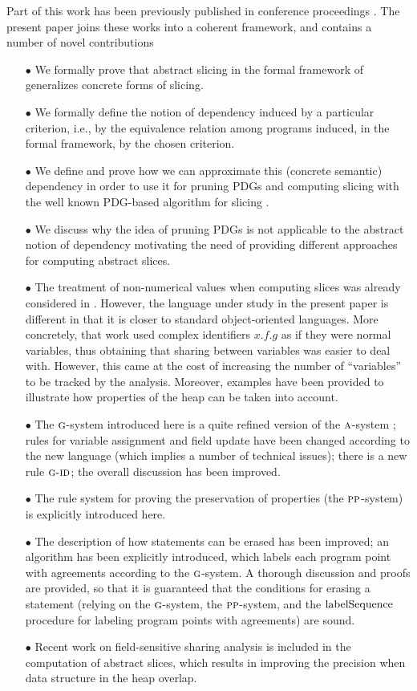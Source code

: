 \documentclass[prodmode,acmtocl]{acmsmall}
\newcommand{\0}{\mbox{\bf 0}}
\newcommand{\CODE}[1]{\ensuremath{\mbox{\lstinline!#1!}\xspace}\xspace}
\newcommand{\RULENAME}[1]{\textsc{#1}}
\newcommand{\GRULENAME}[1]{\textsc{g-#1}}
\newcommand{\PSMTH}[1]{$\RULENAME{pp}$-#1}
\def\PSYSTEM{\PSMTH{system}\xspace}
\newcommand{\GSMTH}[1]{$\RULENAME{g}$-#1}
\def\GSYSTEM{\GSMTH{system}\xspace}
\begin{document}
Part of this work has been previously published in conference
proceedings \cite{MastroeniZanardini,Zanardini,MastroeniNicolic}.  The
present paper joins these works into a coherent framework, and
contains a number of novel contributions
\begin{itemize}
\item[$\bullet$] We formally prove that abstract slicing in the formal
  framework of \cite{AForm} generalizes concrete forms of slicing.
\item[$\bullet$] We formally define the notion of dependency induced
  by a particular criterion, i.e., by the equivalence relation among
  programs induced, in the formal framework, by the chosen criterion.
\item[$\bullet$] We define and prove how we can approximate this
  (concrete semantic) dependency in order to use it for pruning PDGs
  and computing slicing with the well known PDG-based algorithm for
  slicing \cite{RY88}.
\item[$\bullet$] We discuss why the idea of pruning PDGs is not
  applicable to the abstract notion of dependency motivating the need
  of providing different approaches for computing abstract slices.
\item[$\bullet$] The treatment of non-numerical values when computing
  slices was already considered in \cite{Zanardini}.  However, the
  language under study in the present paper is different in that it is
  closer to standard object-oriented languages.  More concretely, that
  work used complex identifiers $x.f.g$ as if they were normal
  variables, thus obtaining that sharing between variables was easier
  to deal with.  However, this came at the cost of increasing the
  number of ``variables'' to be tracked by the analysis.  Moreover,
  examples have been provided to illustrate how properties of the heap
  can be taken into account.
\item[$\bullet$] The \GSYSTEM introduced here is a quite refined
  version of the $\RULENAME{a}$-system \cite{Zanardini}; rules for
  variable assignment and field update have been changed according to
  the new language (which implies a number of technical issues); there
  is a new rule $\GRULENAME{id}$; the overall discussion has been
  improved.
\item[$\bullet$] The rule system for proving the preservation of
  properties (the \PSYSTEM) is explicitly introduced here.
\item[$\bullet$] The description of how statements can be erased has
  been improved; an algorithm has been explicitly introduced, which
  labels each program point with agreements according to the \GSYSTEM.
  A thorough discussion and proofs are provided, so that it is
  guaranteed that the conditions for erasing a statement (relying on
  the \GSYSTEM, the \PSYSTEM, and the \CODE{labelSequence} procedure
  for labeling program points with agreements) are sound.
\item[$\bullet$] Recent work on field-sensitive sharing analysis
  \cite{ZanardiniG15sh} is included in the computation of abstract
  slices, which results in improving the precision when data structure
  in the heap overlap.
\end{itemize}
\end{document}
